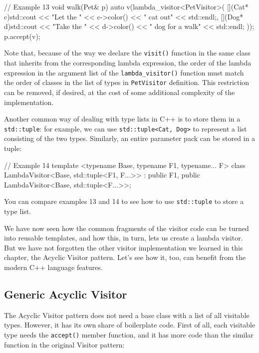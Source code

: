 \begin{code}
// Example 13
void walk(Pet& p) {
  auto v(lambda_visitor<PetVisitor>(
  [](Cat* c){std::cout << "Let the " << c->color()
                         << " cat out" << std::endl;},
  [](Dog* d){std::cout << "Take the " << d->color()
                       << " dog for a walk" << std::endl;}
  ));
  p.accept(v);
}
\end{code}

Note that, because of the way we declare the \texttt{visit()} function in the same class that inherits from the corresponding lambda expression, the order of the lambda expression in the argument list of the \texttt{lambda\_visitor()} function must match the order of classes in the list of types in \texttt{PetVisitor} definition. This restriction can be removed, if desired, at the cost of some additional complexity of the implementation.

Another common way of dealing with type lists in C++ is to store them in a \texttt{std::tuple}: for example, we can use \texttt{std::tuple\textless{}Cat,\ Dog\textgreater{}} to represent a list consisting of the two types. Similarly, an entire parameter pack can be stored in a tuple:

\begin{code}
// Example 14
template <typename Base, typename F1, typename... F>
class LambdaVisitor<Base, std::tuple<F1, F...>> :
  public F1, public LambdaVisitor<Base, std::tuple<F...>>;
\end{code}

You can compare examples 13 and 14 to see how to use \texttt{std::tuple} to store a type list.

We have now seen how the common fragments of the visitor code can be turned into reusable templates, and how this, in turn, lets us create a lambda visitor. But we have not forgotten the other visitor implementation we learned in this chapter, the Acyclic Visitor pattern. Let's see how it, too, can benefit from the modern C++ language features.

\subsection{Generic Acyclic Visitor}

The Acyclic Visitor pattern does not need a base class with a list of all visitable types. However, it has its own share of boilerplate code. First of all, each visitable type needs the \texttt{accept()} member function, and it has more code than the similar function in the original Visitor pattern:

